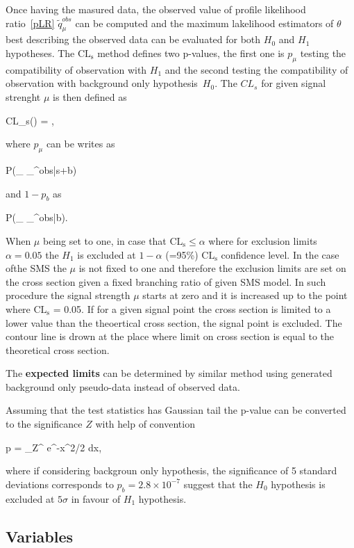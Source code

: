 Once having the masured data, the observed value of profile likelihood ratio~\ref{pLR} $\tilde{q}_{\mu}^{obs}$ can be computed and the maximum lakelihood estimators of $\theta$ best describing the observed data can be evaluated for both $H_{0}$ and $H_{1}$ hypotheses. The $\mathrm{CL_{s}}$  method defines two p-values, the first one is $p_{\mu}$ testing the compatibility of observation with $H_{1}$ and the second testing the compatibility of observation with background only hypothesis~$H_{0}$. The $CL_{s}$ for given signal strenght $\mu$ is then defined as

{
CL_{s}(\mu) = ,
}

where $p_{\mu}$ can be writes as

{
P(_{\mu} \geq {}_{\mu}^{obs}|s+b)
}

and $1-p_{b}$ as

{
P(_{\mu} \geq {}_{\mu}^{obs}|b).
}

When $\mu$ being set to one, in case that $\mathrm{CL_{s}} \leq \alpha$ where for exclusion limits $\alpha = 0.05$ the $H_{1}$ is excluded at $1-\alpha$ (=95\%) $\mathrm{CL_{s}}$ confidence level. In the case ofthe  SMS the $\mu$ is not fixed to one and therefore the exclusion limits are set on the cross section given a fixed branching ratio of given SMS model. In such procedure the signal strength $\mu$ starts at zero and it is increased up to the point where $\mathrm{CL_{s}}$ = 0.05. If for a given signal point the cross section is limited to a lower value than the theoertical cross section, the signal point is excluded. The contour line is drown at the place where limit on cross section is equal to the theoretical cross section.

The \textbf{expected limits} can be determined by similar method using generated background only pseudo-data instead of observed data. 

Assuming that the test statistics has Gaussian tail  the p-value can be converted to the significance $Z$ with help of convention

{
 p = \int_Z^{\infty}  e^{-x^{2}/2} dx,
}

where if considering backgroun only hypothesis, the significance of 5 standard deviations corresponds to $p_{b} = 2.8 \times 10^{-7} $ suggest that the $H_{0}$ hypothesis is excluded at $5 \sigma$ in favour of $H_{1}$ hypothesis. %

\subsection{Variables~\label{sec:variables}}

